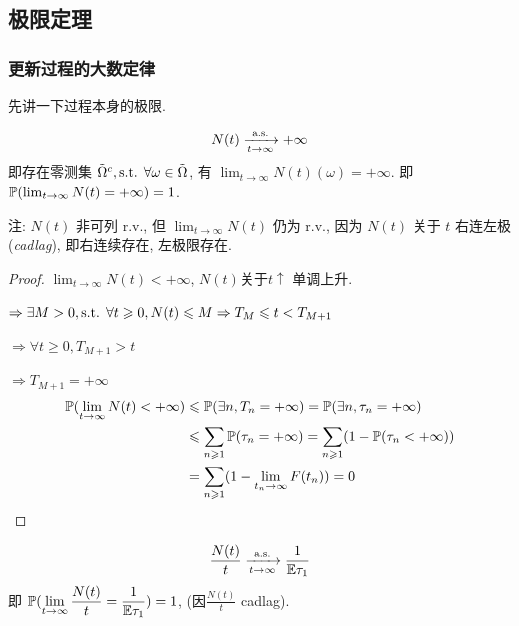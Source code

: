 \subsection{极限定理}
\subsubsection{更新过程的大数定律}

先讲一下过程本身的极限.
\begin{lemma}\label{lem:p114-lem2}
    \[
    N(t)\xrightarrow[t\to\infty]{\text{a.s.}} +\infty
    \]
    即存在零测集 $\tilde{\Omega}^c,\text{s.t. } \forall \omega \in \tilde{\Omega}$, 有 $\lim_{t\to\infty}N(t)(\omega)=+\infty$. 即 $\mathbb{P}(\lim_{t\to\infty}N(t)=+\infty)=1$.

    注: $N(t)$ 非可列 r.v., 但 $\lim_{t\to\infty}N(t)$ 仍为 r.v., 因为 $N(t)$ 关于 $t$ 右连左极 (\textit{cadlag}), 即右连续存在, 左极限存在.
\end{lemma}

\begin{proof}
    $\lim_{t\to\infty}N(t)<+\infty$, $N(t)$关于$t\uparrow$ 单调上升.

    $\Rightarrow \exists M>0,\text{s.t. } \forall t\geqslant 0, N(t)\leqslant M\Rightarrow T_M\leqslant t< T_{M+1}$

    $\Rightarrow \forall t\geq 0,T_{M+1}>t$

    $\Rightarrow T_{M+1}=+\infty$
    \[
    \begin{aligned}
        \mathbb{P}(\lim_{t \to \infty}N(t)<+\infty)&\leqslant \mathbb{P}(\exists n,T_n=+\infty)=\mathbb{P}(\exists n,\tau_n=+\infty)\\
        &\leqslant \sum_{n\geqslant 1}\mathbb{P}(\tau_n=+\infty)=\sum_{n\geqslant 1}(1-\mathbb{P}(\tau_n<+\infty))\\
        &=\sum_{n\geqslant 1}(1-\lim_{t_n \to \infty}F(t_n))=0
    \end{aligned}
    \]
\end{proof}

\begin{theorem}[更新过程的LLN]\label{thm:p114-thm3.1}
    \[
    \frac{N(t)}{t}\xrightarrow[t\to\infty]{\text{a.s.}}\frac{1}{\mathbb E\tau_1}
    \]
    即 $\displaystyle\mathbb{P}(\lim_{t \to \infty}\frac{N(t)}{t}=\frac{1}{\mathbb E\tau_1})=1$, (因$\displaystyle\frac{N(t)}{t}$ cadlag). 
\end{theorem}

